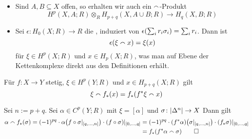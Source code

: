 \begin{bemerkung}[label=bem_augmentation_cap,{name=[{Augmentation und Cap-Produkt}]}] \leavevmode
	\begin{itemize}
		\item Sind $A,B \subseteq X$ offen, so erhalten wir auch ein $\smallfrown$-Produkt
		\[
			H^p(X,A;R) \otimes_R H_{p+q}(X,A\cup B;R) \longrightarrow H_q(X,B;R)
		\]
		\item Sei $\epsilon \colon H_0(X;R) \to R$ die , induziert von $\epsilon \enbrace*{\sum_{i}r_i \sigma_i} = \sum_i r_i$. Dann ist 
		\[
			\epsilon \enbrace*{\xi \capp x} = \xi(x)
		\]
		für $\xi \in H^p(X;R)$ und $x \in H_p(X;R)$, was man auf Ebene der Kettenkomplexe direkt aus den Definitionen erhält.
	\end{itemize}
\end{bemerkung}

\begin{lemma}[{name=[Cap-Produkt und induzierte Abbildungen]}]
	Für $f \colon X \to Y$ stetig, $\xi \in H^p(Y;R)$ und $x \in H_{p+q}(X;R)$ gilt
	\[
		\xi \capp f_*(x) = f_* \enbrace*{f^* \xi \capp x}
	\]
\end{lemma}
\begin{beweis}
	Sei $n := p+q$.
	Sei $\alpha \in C^p(Y;R)$ mit $\xi=[\alpha]$ und $\sigma \colon \abs*{\Delta^{n}}\to X$ 
	Dann gilt
	\begin{align}
		\alpha \capp f_*(\sigma) = (-1)^{pq} \cdot \alpha \enbrace*{f \circ \sigma|_{\benbrace*{q,\ldots ,n}}} \cdot (f \circ \sigma)|_{\benbrace*{0,\ldots ,q}}
		&= (-1)^{pq} \cdot (f^* \alpha) \enbrace*{\sigma|_{\benbrace*{q,\ldots ,n}}} \cdot (f_* \sigma)|_{\benbrace*{0,\ldots ,q}} \\
		&= f_* \enbrace*{f^* \alpha \capp \sigma} \qedhere
	\end{align}
\end{beweis}

